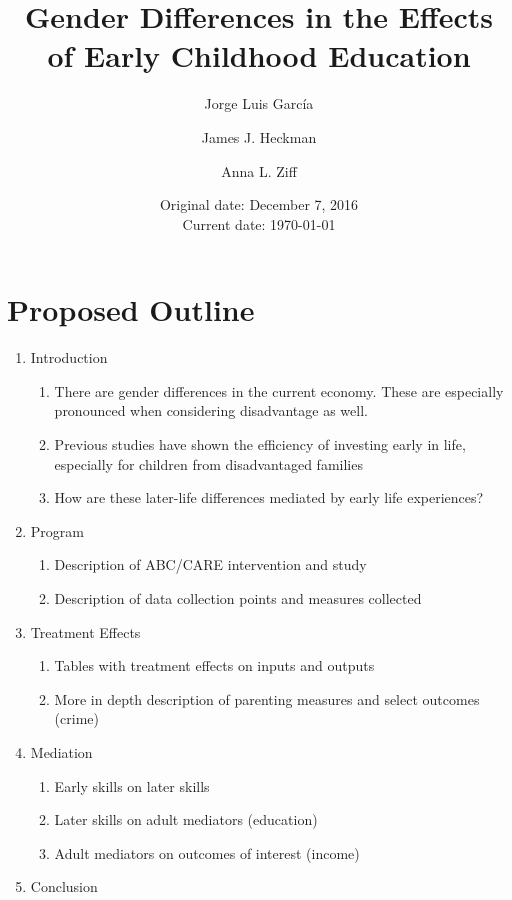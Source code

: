 







\title{Gender Differences in the Effects of Early Childhood Education}
\author{Jorge Luis Garc\'{i}a \and James J. Heckman \and Anna L. Ziff}
\date{Original date: December 7, 2016 \\ Current date: \today}
\maketitle

\section{Proposed Outline}

\begin{enumerate}
\item	Introduction
	\begin{enumerate}
		\item There are gender differences in the current economy. These are especially pronounced when considering disadvantage as well.
		\item Previous studies have shown the efficiency of investing early in life, especially for children from disadvantaged families
		\item How are these later-life differences mediated by early life experiences?
	\end{enumerate}
\item Program
	\begin{enumerate}
		\item Description of ABC/CARE intervention and study
		\item Description of data collection points and measures collected
	\end{enumerate}
\item Treatment Effects
	\begin{enumerate}
		\item Tables with treatment effects on inputs and outputs
		\item More in depth description of parenting measures and select outcomes (crime)
	\end{enumerate}
\item Mediation
	\begin{enumerate}
		\item Early skills on later skills
		\item Later skills on adult mediators (education)
		\item Adult mediators on outcomes of interest (income)
	\end{enumerate}
\item Conclusion
\end{enumerate}

